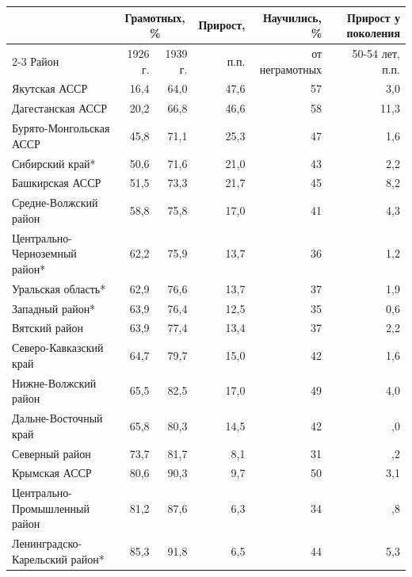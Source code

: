 \begin{tabular}{lrrrrr}
\toprule
 & \multicolumn{2}{c}{Грамотных, \%} & Прирост, & Научились, \% & Прирост у поколения \\
\cmidrule(lr){2-3}
Район & 1926 г. & 1939 г. & п.п. & от неграмотных & 50-54 лет, п.п. \\
\midrule
Якутская АССР & 16,4 & 64,0 & 47,6 & 57 & 3,0 \\
Дагестанская АССР & 20,2 & 66,8 & 46,6 & 58 & 11,3 \\
Бурято-Монгольская АССР & 45,8 & 71,1 & 25,3 & 47 & 1,6 \\
Сибирский край* & 50,6 & 71,6 & 21,0 & 43 & 2,2 \\
Башкирская АССР & 51,5 & 73,3 & 21,7 & 45 & 8,2 \\
Средне-Волжский район & 58,8 & 75,8 & 17,0 & 41 & 4,3 \\
Центрально-Черноземный район* & 62,2 & 75,9 & 13,7 & 36 & 1,2 \\
Уральская область* & 62,9 & 76,6 & 13,7 & 37 & 1,9 \\
Западный район* & 63,9 & 76,4 & 12,5 & 35 & 0,6 \\
Вятский район & 63,9 & 77,4 & 13,4 & 37 & 2,2 \\
Северо-Кавказский край & 64,7 & 79,7 & 15,0 & 42 & 1,6 \\
Нижне-Волжский район & 65,5 & 82,5 & 17,0 & 49 & 4,0 \\
Дальне-Восточный край & 65,8 & 80,3 & 14,5 & 42 & \m 2,0 \\
Северный район & 73,7 & 81,7 & 8,1 & 31 & \m 0,2 \\
Крымская АССР & 80,6 & 90,3 & 9,7 & 50 & 3,1 \\
Центрально-Промышленный район & 81,2 & 87,6 & 6,3 & 34 & \m 0,8 \\
Ленинградско-Карельский район* & 85,3 & 91,8 & 6,5 & 44 & 5,3 \\
\bottomrule
\end{tabular}
